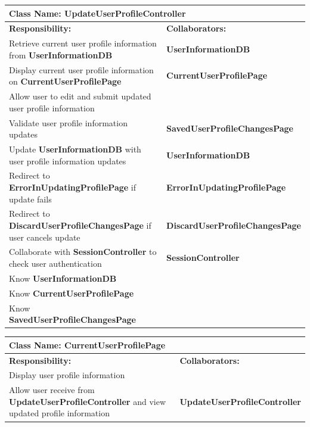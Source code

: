 \documentclass[]{article}
\begin{document}
     \begin{table}[H]
        \centering
        \begin{tabular}{|p{5cm}|p{5cm}|}
        \hline 
         \multicolumn{2}{|l|}{\textbf{Class Name:} UpdateUserProfileController} \\
        \hline
        \textbf{Responsibility:} & \textbf{Collaborators:} \\
        \hline
        Retrieve current user profile information from \textbf{UserInformationDB} & \textbf{UserInformationDB} \\
        \hline
        Display current user profile information on \textbf{CurrentUserProfilePage} & \textbf{CurrentUserProfilePage} \\
        \hline
        Allow user to edit and submit updated user profile information & \phantom{} \\
        \hline
        Validate user profile information updates & \textbf{SavedUserProfileChangesPage} \\
        \hline
        Update \textbf{UserInformationDB} with user profile information updates & \textbf{UserInformationDB} \\
        \hline
        Redirect to \textbf{ErrorInUpdatingProfilePage} if update fails & \textbf{ErrorInUpdatingProfilePage} \\
        \hline
        Redirect to \textbf{DiscardUserProfileChangesPage} if user cancels update & \textbf{DiscardUserProfileChangesPage} \\
        \hline
        Collaborate with \textbf{SessionController} to check user authentication & \textbf{SessionController} \\
        \hline
        Know \textbf{UserInformationDB} & \phantom{} \\
        \hline
         Know \textbf{CurrentUserProfilePage} & \phantom{} \\
        \hline
        Know \textbf{SavedUserProfileChangesPage} & \phantom{} \\
        \hline 
        
        
        
        \end{tabular}
    \end{table}


\begin{table}[H]
        \centering
        \begin{tabular}{|p{5cm}|p{5cm}|}
        \hline 
         \multicolumn{2}{|l|}{\textbf{Class Name:} CurrentUserProfilePage} \\
        \hline
        \textbf{Responsibility:} & \textbf{Collaborators:} \\
        \hline
        Display user profile information &  \phantom{} \\
        \hline
        Allow user receive from \textbf{UpdateUserProfileController}  and view updated profile information & \textbf{UpdateUserProfileController} \\
        \hline
        
        \end{tabular}
    \end{table}
\end{document}
